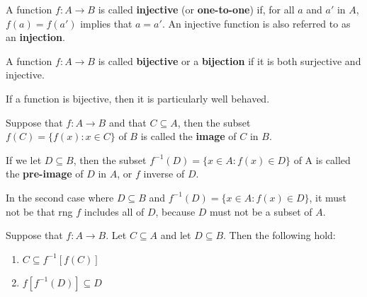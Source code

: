 \begin{definition}[Injection]
	A function $f:A\rightarrow B$ is called \textbf{injective} (or \textbf{one-to-one}) if, for all $a$ and $a'$ in $A$, $f(a)=f(a')$ implies that $a=a'$. An injective function is also referred to as an \textbf{injection}.
\end{definition}

\begin{definition}[Bijection]
	A function $f:A\rightarrow B$ is called \textbf{bijective} or a \textbf{bijection} if it is both surjective and injective.
\end{definition}

If a function is bijective, then it is particularly well behaved.

\begin{definition}
	\label{image}
	Suppose that $f:A\rightarrow B$ and that $C\subseteq A$, then the subset $f(C) = \{f(x):x\in C\}$ of $B$ is called the \textbf{image} of $C$ in $B$.
	
	If we let $D\subseteq B$, then the subset $f^{-1}(D)=\{x\in A: f(x)\in D\}$ of A is called the \textbf{pre-image} of $D$ in $A$, or $f$ inverse of $D$. 
\end{definition}

\begin{remark}
	In the second case where $D\subseteq B$ and $f^{-1}(D)=\{x\in A: f(x)\in D\}$, it must not be that rng $f$ includes all of $D$, because $D$ must not be a subset of $A$.
\end{remark}

\begin{theorem}
	Suppose that $f:A\rightarrow B$. Let $C\subseteq A$ and let $D\subseteq B$. Then the following hold:
	\begin{enumerate}
		\item $C \subseteq f^{-1}[f(C)]$
		\item $f[f^{-1}(D)]\subseteq D$
	\end{enumerate}
\end{theorem}
	
